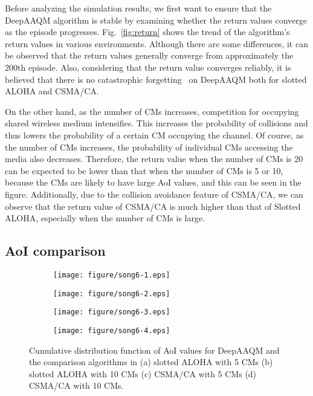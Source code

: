 \documentclass[journal]{IEEEtran}
\begin{document}
Before analyzing the simulation results, we first want to ensure that the DeepAAQM algorithm is stable by examining whether the return values converge as the episode progresses. Fig.~\ref{fig:return} shows the trend of the algorithm's return values in various environments. Although there are some differences, it can be observed that the return values generally converge from approximately the 200th episode. Also, considering that the return value converges reliably, it is believed that there is no catastrophic forgetting~\cite{mccloskey1989catastrophic} on DeepAAQM both for slotted ALOHA and CSMA/CA.

On the other hand, as the number of CMs increases, competition for occupying shared wireless medium intensifies. This increases the probability of collisions and thus lowers the probability of a certain CM occupying the channel. Of course, as the number of CMs increases, the probability of individual CMs accessing the media also decreases. Therefore, the return value when the number of CMs is 20 can be expected to be lower than that when the number of CMs is 5 or 10, because the CMs are likely to have large AoI values, and this can be seen in the figure. Additionally, due to the collision avoidance feature of CSMA/CA, we can observe that the return value of CSMA/CA is much higher than that of Slotted ALOHA, especially when the number of CMs is large.



\subsection{AoI comparison}
\label{subsec:aoicomp}

\begin{figure}
    \centering
    \begin{subfigure}{0.24\textwidth}
        \centering
        \texttt{[image: figure/song6-1.eps]}
        \caption{}
        \label{fig:cdfaoi1}
    \end{subfigure}
    \begin{subfigure}{0.24\textwidth}
        \centering
        \texttt{[image: figure/song6-2.eps]}
        \caption{}
        \label{fig:cdfaoi2}
    \end{subfigure}
    \hfill
    \begin{subfigure}{0.24\textwidth}
        \centering
        \texttt{[image: figure/song6-3.eps]}
        \caption{}
        \label{fig:cdfaoi3}
    \end{subfigure}
    \begin{subfigure}{0.24\textwidth}
        \centering
        \texttt{[image: figure/song6-4.eps]}
        \caption{}
        \label{fig:cdfaoi4}
    \end{subfigure}
    \caption{Cumulative distribution function of AoI values for DeepAAQM and the comparison algorithms in (a) slotted ALOHA with 5 CMs (b) slotted ALOHA with 10 CMs (c) CSMA/CA with 5 CMs (d) CSMA/CA with 10 CMs.}
    \label{fig:aoicomp}
\end{figure}
\end{document}
